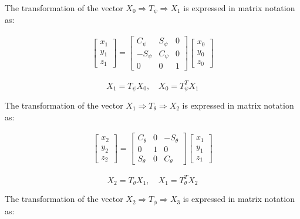 The transformation of the vector $X_{0} \Rightarrow T_{\psi} \Rightarrow X_{1}$ is expressed in matrix notation as:

\begin{gather}
    \begin{bmatrix}
    x_{1}\\
    y_{1}\\
    z_{1}
    \end{bmatrix}
    =
    \begin{bmatrix}
    C_{\psi} & S_{\psi} & 0\\
    -S_{\psi} & C_{\psi} & 0\\
    0 & 0 & 1
    \end{bmatrix}
    \begin{bmatrix}
    x_{0}\\
    y_{0}\\
    z_{0}
    \end{bmatrix}
\end{gather}

\begin{equation}
    X_{1} = T_{\psi}X_{0},\quad X_{0}= T^T_{\psi}X_{1}
\end{equation}

The transformation of the vector $X_{1} \Rightarrow T_{\theta} \Rightarrow X_{2}$ is expressed in matrix notation as:

\begin{gather}
    \begin{bmatrix}
    x_{2}\\
    y_{2}\\
    z_{2}
    \end{bmatrix}
    =
    \begin{bmatrix}
    C_{\theta} & 0 & -S_{\theta}\\
    0 & 1 & 0\\
    S_{\theta} & 0 & C_{\theta}
    \end{bmatrix}
    \begin{bmatrix}
    x_{1}\\
    y_{1}\\
    z_{1}
    \end{bmatrix}
\end{gather}

\begin{equation}
    X_{2} = T_{\theta}X_{1},\quad X_{1}= T^T_{\theta}X_{2}
\end{equation}

The transformation of the vector $X_{2} \Rightarrow T_{\phi} \Rightarrow X_{3}$ is expressed in matrix notation as:

